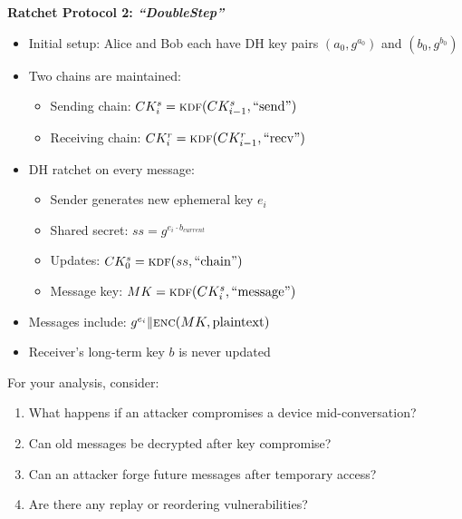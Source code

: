 \documentclass[10pt,a4paper,american]{exam}
\begin{document}
\begin{enumerate}
	      \textbf{Ratchet Protocol 2: \textit{``DoubleStep''}}
	      \begin{itemize}
		      \item Initial setup: Alice and Bob each have DH key pairs $(a_0, g^{a_0})$ and $(b_0, g^{b_0})$
		      \item Two chains are maintained:
		            \begin{itemize}
			            \item Sending chain: $CK^s_i = \func{kdf}{CK^s_{i-1}, \text{``send''}}$
			            \item Receiving chain: $CK^r_i = \func{kdf}{CK^r_{i-1}, \text{``recv''}}$
		            \end{itemize}
		      \item DH ratchet on every message:
		            \begin{itemize}
			            \item Sender generates new ephemeral key $e_i$
			            \item Shared secret: $ss = g^{e_i \cdot b_{current}}$
			            \item Updates: $CK^s_0 = \func{kdf}{ss, \text{``chain''}}$
			            \item Message key: $MK = \func{kdf}{CK^s_i, \text{``message''}}$
		            \end{itemize}
		      \item Messages include: $g^{e_i} \| \func{enc}{MK, \text{plaintext}}$
		      \item Receiver's long-term key $b$ is never updated
	      \end{itemize}

	      For your analysis, consider:
	      \begin{enumerate}
		      \item What happens if an attacker compromises a device mid-conversation?
		      \item Can old messages be decrypted after key compromise?
		      \item Can an attacker forge future messages after temporary access?
		      \item Are there any replay or reordering vulnerabilities?
	      \end{enumerate}
\end{enumerate}
\end{document}
